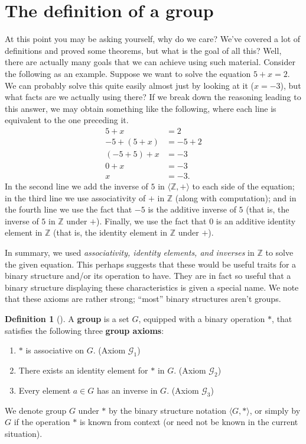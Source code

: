 \documentclass[10pt,openany,oneside]{book}
\newcommand{\terminology}[1]{\textbf{#1}}
\theoremstyle{plain}
\theoremstyle{definition}
\newtheorem{definition}[theorem]{Definition}
\theoremstyle{definition}
\theoremstyle{definition}
\theoremstyle{definition}
\numberwithin{equation}{section}
\def\Z{\mathbb{Z}}
\def\G{\mathcal{G}}
\newcommand{\amp}{&}
\begin{document}
\section[{The definition of a group}]{The definition of a group}\label{section-5}
At this point you may be asking yourself, why do we care? We've covered a lot of definitions and proved some theorems, but what is the goal of all this? Well, there are actually many goals that we can achieve using such material. Consider the following as an example. Suppose we want to solve the equation \(5+x=2\). We can probably solve this quite easily almost just by looking at it (\(x=-3\)), but what facts are we actually using there? If we break down the reasoning leading to this answer, we may obtain something like the following, where each line is equivalent to the one preceding it.%
\begin{align*}
5+x\amp =2 \\
-5+(5+x)\amp =-5+2\\
(-5+5)+x \amp =-3\\
0+x\amp =-3\\
x\amp =-3.
\end{align*}
In the second line we add the inverse of \(5\) in \(\langle \Z, +\rangle\) to each side of the equation; in the third line we use associativity of \(+\) in \(\Z\) (along with computation); and in the fourth line we use the fact that \(-5\) is the additive inverse of \(5\) (that is, the inverse of \(5\) in \(\Z\) under \(+\)). Finally, we use the fact that 0 is an additive identity element in \(\Z\) (that is, the identity element in \(\Z\) under \(+\)).%
\par
In summary, we used \emph{associativity, identity elements, and inverses} in \(\Z\) to solve the given equation. This perhaps suggests that these would be useful traits for a binary structure and/or its operation to have. They are in fact so useful that a binary structure displaying these characteristics is given a special name. We note that these axioms are rather strong; ``most'' binary structures aren't groups.%
\begin{definition}[{}]\label{definition-19}
A \terminology{group} is a set \(G\), equipped with a binary operation \(*\), that satisfies the following three \terminology{group axioms}: \leavevmode%
\begin{enumerate}[label=\Roman*]
\item\hypertarget{li-74}{}\(*\) is associative on \(G\). (Axiom \(\G_1\))%
\item\hypertarget{li-75}{}There exists an identity element for \(*\) in \(G\). (Axiom \(\G_2\))%
\item\hypertarget{li-76}{}Every element \(a\in G\) has an inverse in \(G\). (Axiom \(\G_3\))%
\end{enumerate}
%
\par
We denote group \(G\) under \(*\) by the binary structure notation \(\langle G,*\rangle\), or simply by \(G\) if the operation \(*\) is known from context (or need not be known in the current situation).%
\end{definition}
\end{document}
